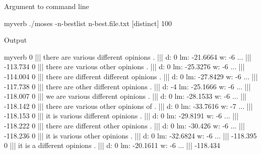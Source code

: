 \documentclass[landscape]{uedslides2C}
\begin{document}
%
%      
%      
%          
% 

\vspace{5mm}
\begin{center}
Argument to command line\\[2mm]
\begin{SaveVerbatim}{myverb}
 ./moses -n-bestlist n-best.file.txt [distinct] 100
\end{SaveVerbatim}
\colorbox{gray}{}

\vspace{10mm}
Output\\[2mm]
{\footnotesize \begin{SaveVerbatim}{myverb}
0 ||| there are various different opinions .  ||| d: 0 lm: -21.6664 w: -6 ...  ||| -113.734
0 ||| there are various other opinions .  ||| d: 0 lm: -25.3276 w: -6 ... ||| -114.004
0 ||| there are different different opinions .  ||| d: 0 lm: -27.8429 w: -6 ...  ||| -117.738
0 ||| there are other different opinions .  ||| d: -4 lm: -25.1666 w: -6 ...  ||| -118.007
0 ||| we are various different opinions .  ||| d: 0 lm: -28.1533 w: -6 ...  ||| -118.142
0 ||| there are various other opinions of .  ||| d: 0 lm: -33.7616 w: -7 ...  ||| -118.153
0 ||| it is various different opinions .  ||| d: 0 lm: -29.8191 w: -6  ... ||| -118.222
0 ||| there are different other opinions .  ||| d: 0 lm: -30.426 w: -6 ...  ||| -118.236
0 ||| it is various other opinions .  ||| d: 0 lm: -32.6824 w: -6 ... ||| -118.395
0 ||| it is a different opinions .  ||| d: 0 lm: -20.1611 w: -6 ...  ||| -118.434

\end{SaveVerbatim}
\colorbox{gray}{}}
\end{center}
 
\end{document}
